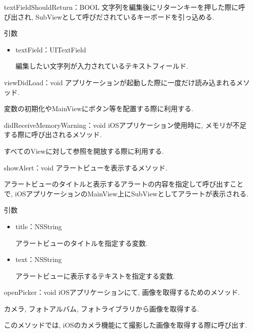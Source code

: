 \begin{description}
\begin{itemize}
\begin{itembox}[l]{textFieldShouldReturn：BOOL}
文字列を編集後にリターンキーを押した際に呼び出され, SubViewとして呼びだされているキーボードを引っ込める.

\begin{itembox}[l]{引数}
\begin{itemize}
\item textField：UITextField

編集したい文字列が入力されているテキストフィールド.
\end{itemize}
\end{itembox}
\end{itembox}

\begin{itembox}[l]{viewDidLoad：void}
アプリケーションが起動した際に一度だけ読み込まれるメソッド.

変数の初期化やMainViewにボタン等を配置する際に利用する.
\end{itembox}

\begin{itembox}[l]{didReceiveMemoryWarning：void}
iOSアプリケーション使用時に, メモリが不足する際に呼び出されるメソッド.

すべてのViewに対して参照を開放する際に利用する.
\end{itembox}

\begin{itembox}[l]{showAlert：void}
アラートビューを表示するメソッド.

アラートビューのタイトルと表示するアラートの内容を指定して呼び出すことで, iOSアプリケーションのMainView上にSubViewとしてアラートが表示される.

\begin{itembox}[l]{引数}
\begin{itemize}
\item title：NSString

アラートビューのタイトルを指定する変数.

\item text：NSString

アラートビューに表示するテキストを指定する変数.
\end{itemize}
\end{itembox}
\end{itembox}

\begin{itembox}[l]{openPicker：void}
iOSアプリケーションにて, 画像を取得するためのメソッド.

カメラ, フォトアルバム, フォトライブラリから画像を取得する.

このメソッドでは, iOSのカメラ機能にて撮影した画像を取得する際に呼び出す.


\end{itembox}
\end{itemize}
\end{description}
